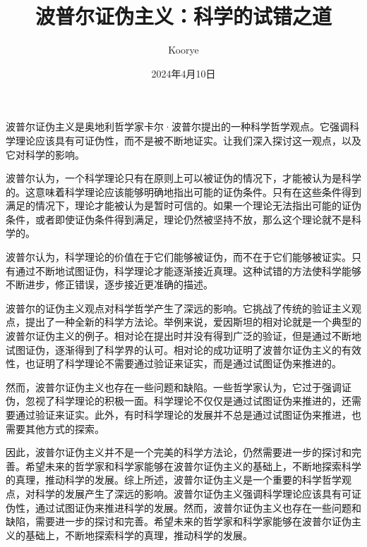 \documentclass{article}
\title{波普尔证伪主义：科学的试错之道}
\author{Koorye}
\date{2024年4月10日}
\begin{document}
\maketitle

波普尔证伪主义是奥地利哲学家卡尔·波普尔提出的一种科学哲学观点。它强调科学理论应该具有可证伪性，而不是被不断地证实。让我们深入探讨这一观点，以及它对科学的影响。

波普尔认为，一个科学理论只有在原则上可以被证伪的情况下，才能被认为是科学的。这意味着科学理论应该能够明确地指出可能的证伪条件。只有在这些条件得到满足的情况下，理论才能被认为是暂时可信的。如果一个理论无法指出可能的证伪条件，或者即使证伪条件得到满足，理论仍然被坚持不放，那么这个理论就不是科学的。

波普尔认为，科学理论的价值在于它们能够被证伪，而不在于它们能够被证实。只有通过不断地试图证伪，科学理论才能逐渐接近真理。这种试错的方法使科学能够不断进步，修正错误，逐步接近更准确的描述。

波普尔的证伪主义观点对科学哲学产生了深远的影响。它挑战了传统的验证主义观点，提出了一种全新的科学方法论。举例来说，爱因斯坦的相对论就是一个典型的波普尔证伪主义的例子。相对论在提出时并没有得到广泛的验证，但是通过不断地试图证伪，逐渐得到了科学界的认可。相对论的成功证明了波普尔证伪主义的有效性，也证明了科学理论不需要通过验证来证实，而是通过试图证伪来推进的。

然而，波普尔证伪主义也存在一些问题和缺陷。一些哲学家认为，它过于强调证伪，忽视了科学理论的积极一面。科学理论不仅仅是通过试图证伪来推进的，还需要通过验证来证实。此外，有时科学理论的发展并不总是通过试图证伪来推进，也需要其他方式的探索。

因此，波普尔证伪主义并不是一个完美的科学方法论，仍然需要进一步的探讨和完善。希望未来的哲学家和科学家能够在波普尔证伪主义的基础上，不断地探索科学的真理，推动科学的发展。综上所述，波普尔证伪主义是一个重要的科学哲学观点，对科学的发展产生了深远的影响。波普尔证伪主义强调科学理论应该具有可证伪性，通过试图证伪来推进科学的发展。然而，波普尔证伪主义也存在一些问题和缺陷，需要进一步的探讨和完善。希望未来的哲学家和科学家能够在波普尔证伪主义的基础上，不断地探索科学的真理，推动科学的发展。
\end{document}
